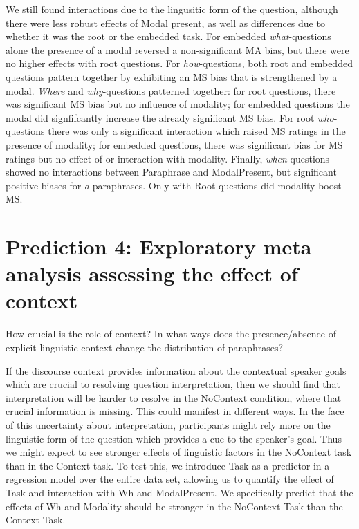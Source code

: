 \documentclass[12pt,letterpaper,table,svgnames,dvipsnames]{article}
\begin{document}
We still found interactions due to the lingusitic form of the question, although there were less robust effects of Modal present, as well as differences due to whether it was the root or the embedded task. For embedded \emph{what}-questions alone the presence of a modal reversed a non-significant MA bias, but there were no higher effects with root questions. For \emph{how}-questions, both root and embedded questions pattern together by exhibiting an MS bias that is strengthened by a modal. \emph{Where} and \emph{why}-questions patterned together: for root questions, there was significant MS bias but no influence of modality; for embedded questions the modal did signfifcantly increase the already significant MS bias. For root \emph{who}-questions there was only a significant interaction which raised MS ratings in the presence of modality; for embedded questions, there was significant bias for MS ratings but no effect of or interaction with modality. Finally, \emph{when}-questions showed no interactions between Paraphrase and ModalPresent, but significant positive biases for \emph{a}-paraphrases. Only with Root questions did modality boost MS.



\section{Prediction 4: Exploratory meta analysis assessing the effect of context}
How crucial is the role of context? In what ways does the presence/absence of explicit linguistic context change the distribution of paraphrases? 

If the discourse context provides information about the contextual speaker goals which are crucial to resolving question interpretation, then we should find that interpretation will be harder to resolve in the NoContext condition, where that crucial information is missing. This could manifest in different ways. In the face of this uncertainty about interpretation, participants might rely more on the linguistic form of the question which provides a cue to the speaker's goal. Thus we might expect to see stronger effects of linguistic factors in the NoContext task than in the Context task. To test this, we introduce Task as a predictor in a regression model over the entire data set, allowing us to quantify the effect of Task and interaction with Wh and ModalPresent. We specifically predict that the effects of Wh and Modality should be stronger in the NoContext Task than the Context Task.
\end{document}
